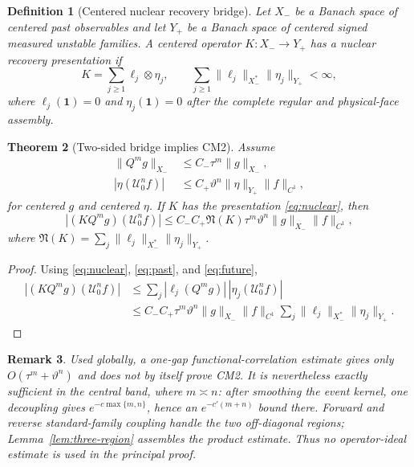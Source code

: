 \documentclass[11pt]{article}
\newtheorem{theorem}{Theorem}[section]
\newtheorem{definition}[theorem]{Definition}
\newtheorem{remark}[theorem]{Remark}
\newcommand{\cU}{\mathcal U}
\newcommand{\one}{\mathbf 1}
\begin{document}
\begin{definition}[Centered nuclear recovery bridge]
Let $X_-$ be a Banach space of centered past observables and let $Y_+$ be a
Banach space of centered signed measured unstable families.  A centered
operator $K:X_-\to Y_+$ has a nuclear recovery presentation if
\begin{equation}
\label{eq:nuclear}
 K=\sum_{j\ge1}\ell_j\otimes\eta_j,
 \qquad
 \sum_{j\ge1}\|\ell_j\|_{X_-^*}\|\eta_j\|_{Y_+}<\infty,
\end{equation}
where $\ell_j(\one)=0$ and $\eta_j(\one)=0$ after the complete regular and
physical-face assembly.
\end{definition}

\begin{theorem}[Two-sided bridge implies CM2]
\label{thm:bridge}
Assume
\begin{align}
 \|Q^mg\|_{X_-}&\le C_-\tau^m\|g\|_{X_-},
       \label{eq:past}\\
 |\eta(\cU_0^nf)|&\le C_+\vartheta^n
       \|\eta\|_{Y_+}\|f\|_{C^1},\label{eq:future}
\end{align}
for centered $g$ and centered $\eta$.  If $K$ has the presentation
\eqref{eq:nuclear}, then
\[
 |(KQ^mg)(\cU_0^nf)|
 \le C_-C_+\mathfrak N(K)\tau^m\vartheta^n
       \|g\|_{X_-}\|f\|_{C^1},
\]
where
$\mathfrak N(K)=\sum_j\|\ell_j\|_{X_-^*}\|\eta_j\|_{Y_+}$.
\end{theorem}

\begin{proof}
Using \eqref{eq:nuclear}, \eqref{eq:past}, and \eqref{eq:future},
\begin{align*}
 |(KQ^mg)(\cU_0^nf)|
 &\le\sum_j|\ell_j(Q^mg)|\,
              |\eta_j(\cU_0^nf)|\\
 &\le C_-C_+\tau^m\vartheta^n\|g\|_{X_-}\|f\|_{C^1}
       \sum_j\|\ell_j\|_{X_-^*}\|\eta_j\|_{Y_+}.
\end{align*}
\end{proof}

\begin{remark}
Used globally, a one-gap functional-correlation estimate gives only
$O(\tau^m+\vartheta^n)$ and does not by itself prove CM2.  It is nevertheless
exactly sufficient in the central band, where $m\asymp n$: after smoothing
the event kernel, one decoupling gives $e^{-c\max\{m,n\}}$, hence an
$e^{-c'(m+n)}$ bound there.  Forward and reverse standard-family coupling
handle the two off-diagonal regions; Lemma~\ref{lem:three-region} assembles
the product estimate.  Thus no operator-ideal estimate is used in the
principal proof.
\end{remark}
\end{document}
